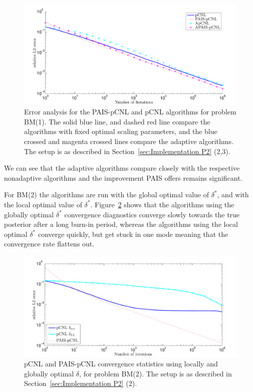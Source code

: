 \documentclass[final]{siamltex}
\begin{document}
\begin{figure}[htpb]
\begin{center}
\includegraphics[width=\textwidth]{"figures/BM1_L2"}
\caption{Error analysis for the PAIS-pCNL and pCNL algorithms for
  problem BM(1). The solid blue line, and dashed red line compare the algorithms with fixed optimal scaling parameters, and the blue crossed and magenta crossed lines compare the adaptive algorithms. The setup is as described in Section~\ref{sec:Implementation P2} (2,3).}
\label{fig:BM1_L2}
\end{center}
\end{figure}

We can see that the adaptive algorithms compare closely with the
respective nonadaptive algorithms and the improvement PAIS offers
remains significant.

For BM(2) the algorithms are run with the global optimal value of $\delta^*$, and with the local optimal value of $\delta^*$. Figure~\ref{fig:BM2_L2} shows that the algorithms using the globally optimal $\delta^*$ convergence diagnostics converge slowly towards the true posterior after a long burn-in period, whereas the algorithms using the local optimal $\delta^*$ converge quickly, but get stuck in one mode meaning that the convergence rate flattens out.

\begin{figure}[h]
\begin{center}
\includegraphics[width=\textwidth]{"figures/BM2_L2"}
\caption{pCNL and PAIS-pCNL convergence statistics using locally and
  globally optimal $\delta$, for problem BM(2). The setup is as described in Section~\ref{sec:Implementation P2} (2).}
\label{fig:BM2_L2}
\end{center}
\end{figure}
\end{document}
